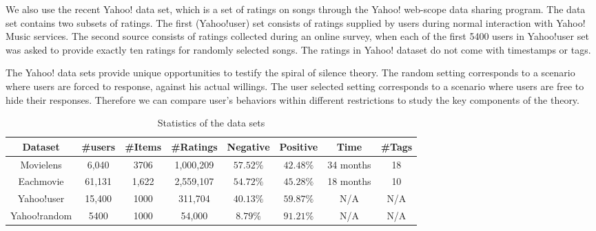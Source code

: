 \documentclass{sig-alternate}
\begin{document}
We also use the recent Yahoo! data set, which is a set of ratings on songs through the Yahoo! web-scope data sharing program. The data set contains two subsets of ratings. The first (Yahoo!user) set consists of ratings supplied by users during normal interaction with Yahoo! Music services. The second source consists of ratings collected during an online survey, when each of the first 5400 users in Yahoo!user set was asked to provide exactly ten ratings for randomly selected songs. The ratings in Yahoo! dataset do not come with timestamps or tags.

The Yahoo! data sets provide unique opportunities to testify the spiral of silence theory.  The random setting corresponds to a scenario where users are forced to response, against his actual willings. The user selected setting corresponds to a scenario where users are free to hide their responses. Therefore we can compare user's behaviors within different restrictions to study the key components of the theory.
\begin{table}[htbp]
\centering
\caption{Statistics of the data sets}\label{tab:statistics}
\begin{tabular}{|c|c|c|c|c|c|c|c|}
\hline
Dataset &\#users & \#Items & \#Ratings & Negative & Positive  & Time & \#Tags\\\hline\hline
Movielens & 6,040 & 3706 & 1,000,209 & $57.52\%$ &$42.48\%$ & 34 months&18 \\\hline
Eachmovie & 61,131 & 1,622 & 2,559,107 & $54.72\%$ & $45.28\%$ &18 months &10 \\\hline
Yahoo!user & 15,400 & 1000 & 311,704 & $40.13\%$ & $59.87\%$ & N/A & N/A\\\hline
Yahoo!random & 5400 &  1000 & 54,000 & $8.79\%$& $91.21\%$ &N/A & N/A\\
\hline
\end{tabular}
\end{table}
\end{document}

